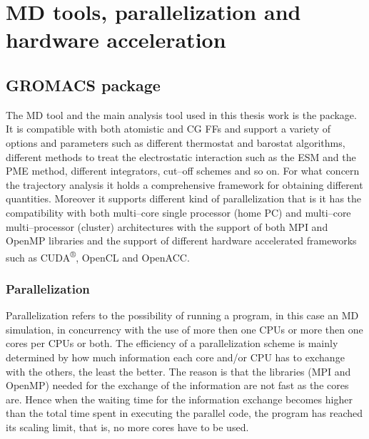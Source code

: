 \chapter{MD tools, parallelization and hardware acceleration}


\section{GROMACS package}
The \ac{MD} tool and the main analysis tool used in this thesis work is the \href{http://www.gromacs.org}{\gromacs}\cite{gromacsManual} package. It is compatible with both atomistic and \ac{CG} \acp{FF} and support a variety of options and parameters such as different thermostat and barostat algorithms, different methods to treat the electrostatic interaction such as the \ac{ESM} and the \ac{PME} method, different integrators, cut--off schemes and so on. For what concern the trajectory analysis it holds a comprehensive framework for obtaining different quantities. Moreover it supports different kind of parallelization that is it has the compatibility with both multi--core single processor (home PC) and multi--core multi--processor (cluster) architectures with the support of both MPI and OpenMP libraries and the support of different hardware accelerated frameworks such as CUDA\textsuperscript{®}, OpenCL and OpenACC.  

\subsection{Parallelization}
Parallelization refers to the possibility of running a program, in this case an \ac{MD} simulation, in concurrency with the use of more then one CPUs or more then one cores per CPUs or both. The efficiency of a parallelization scheme is mainly determined by how much information each core and/or CPU has to exchange with the others, the least the better. The reason is that the libraries (MPI and OpenMP) needed for the exchange of the information are not fast as the cores are. Hence when the waiting time for the information exchange becomes higher than the total time spent in executing the parallel code, the program has reached its scaling limit, that is, no more cores have to be used.

